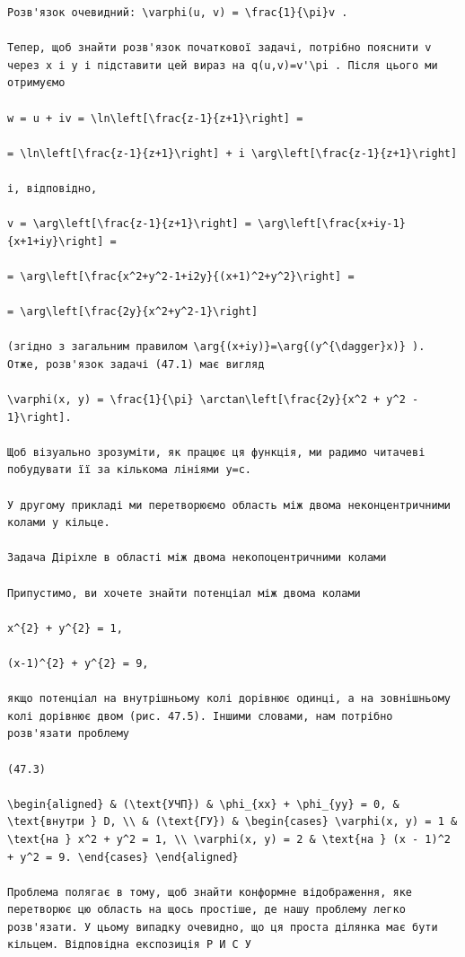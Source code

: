 \documentclass[
  ukrainian,
]{article}
\begin{document}
\begin{verbatim}
Розв'язок очевидний: \varphi(u, v) = \frac{1}{\pi}v .

Тепер, щоб знайти розв'язок початкової задачі, потрібно пояснити v через x і y і підставити цей вираз на q(u,v)=v'\pi . Після цього ми отримуємо

w = u + iv = \ln\left[\frac{z-1}{z+1}\right] =

= \ln\left[\frac{z-1}{z+1}\right] + i \arg\left[\frac{z-1}{z+1}\right]

і, відповідно,

v = \arg\left[\frac{z-1}{z+1}\right] = \arg\left[\frac{x+iy-1}{x+1+iy}\right] =

= \arg\left[\frac{x^2+y^2-1+i2y}{(x+1)^2+y^2}\right] =

= \arg\left[\frac{2y}{x^2+y^2-1}\right]

(згідно з загальним правилом \arg{(x+iy)}=\arg{(y^{\dagger}x)} ). Отже, розв'язок задачі (47.1) має вигляд

\varphi(x, y) = \frac{1}{\pi} \arctan\left[\frac{2y}{x^2 + y^2 - 1}\right].

Щоб візуально зрозуміти, як працює ця функція, ми радимо читачеві побудувати її за кількома лініями y=c.

У другому прикладі ми перетворюємо область між двома неконцентричними колами у кільце.

Задача Діріхле в області між двома некопоцентричними колами

Припустимо, ви хочете знайти потенціал між двома колами

x^{2} + y^{2} = 1,

(x-1)^{2} + y^{2} = 9,

якщо потенціал на внутрішньому колі дорівнює одинці, а на зовнішньому колі дорівнює двом (рис. 47.5). Іншими словами, нам потрібно розв'язати проблему

(47.3)

\begin{aligned} & (\text{УЧП}) & \phi_{xx} + \phi_{yy} = 0, & \text{внутри } D, \\ & (\text{ГУ}) & \begin{cases} \varphi(x, y) = 1 & \text{на } x^2 + y^2 = 1, \\ \varphi(x, y) = 2 & \text{на } (x - 1)^2 + y^2 = 9. \end{cases} \end{aligned}

Проблема полягає в тому, щоб знайти конформне відображення, яке перетворює цю область на щось простіше, де нашу проблему легко розв'язати. У цьому випадку очевидно, що ця проста ділянка має бути кільцем. Відповідна експозиція Р И С У


\end{verbatim}
\end{document}
